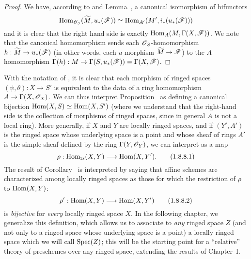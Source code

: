 \begin{proof}
\label{proof-1.1.8.7}
We have, according to  and Lemma~, a canonical
isomorphism of bifunctors
\[
  {\mathop{\mathrm{Hom}}\nolimits}_{\mathscr{O}_S}({\widetilde{M}},u_*(\mathscr{F}))\simeq{\mathop{\mathrm{Hom}}\nolimits}_{A'}(M',i_*(u_*(\mathscr{F})))
\]
and it is clear that the right hand side is exactly ${\mathop{\mathrm{Hom}}\nolimits}_A(M,\Gamma(X,\mathscr{F}))$.
We note that the canonical homomorphism  sends each $\mathscr{O}_S$-homomorphism $h:\wt{M}\to u_*(\sh{F})$ (in other words, each $u$-morphism $\wt{M}\to\sh{F}$) to the $A$-homomorphism $\Gamma(h):M\to\Gamma(S,u_*(\sh{F}))=\Gamma(X,\sh{F})$.
\end{proof}

\begin{env}[1.8.8]
\label{1.1.8.8}
With the notation of , it is clear  that each morphism of ringed spaces $(\psi,\theta):X\to S'$ is equivalent to the data of a ring homomorphism $A\to\Gamma(X,\OO_X)$.
We can thus interpret Proposition~ as defining a canonical bijection ${\mathop{\mathrm{Hom}}\nolimits}(X,S)\simeq{\mathop{\mathrm{Hom}}\nolimits}(X,S')$ (where we understand that the right-hand side is the collection of morphisms of ringed spaces, since in general $A$ is not a local ring).
More generally, if $X$ and $Y$ are locally ringed spaces, and if $(Y',A')$ is the ringed space whose underlying space is a point and whose sheaf of rings $A'$ is the simple sheaf defined by the ring $\Gamma(Y,\mathscr{O}_Y)$, we can interpret  as a map
\begin{equation*}
  \label{1.1.8.8.1}
  \rho:\Hom_\text{rs}(X,Y)\to\Hom(X,Y').
  \tag{1.8.8.1}
\end{equation*}
The result of Corollary~ is interpreted by saying that affine schemes are characterized among locally ringed spaces as those for which the restriction of $\rho$ to
${\mathop{\mathrm{Hom}}\nolimits}(X,Y)$:
\begin{equation*}
  \label{1.1.8.8.2}
  \rho':\Hom(X,Y)\to\Hom(X,Y')
  \tag{1.8.8.2}
\end{equation*}
is \emph{bijective} for \emph{every} locally ringed space $X$.
In the following chapter, we generalize this definition, which allows us to associate to \emph{any} ringed space $Z$ (and not only to a ringed space whose underlying space is a point) a locally ringed space which we will call ${\mathop{\mathrm{Spec}}\nolimits}(Z)$;
this will be the starting point for a ``relative'' theory of preschemes over any ringed space, extending the results of Chapter~I.
\end{env}

